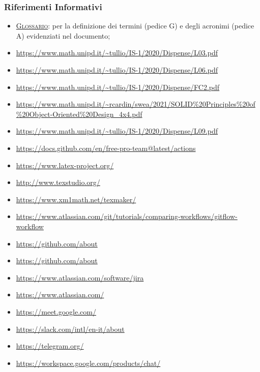     \subsubsection{Riferimenti Informativi}
        \begin{itemize}
        	\item \textsc{\href{https://github.com/Three-Way-Milkshake/docs/wiki/Glossario}{Glossario}}: per la definizione dei termini (pedice G) e degli acronimi (pedice A) evidenziati nel documento;
            \item \url{https://www.math.unipd.it/~tullio/IS-1/2020/Dispense/L03.pdf}
            \item \url{https://www.math.unipd.it/~tullio/IS-1/2020/Dispense/L06.pdf}
            \item \url{https://www.math.unipd.it/~tullio/IS-1/2020/Dispense/FC2.pdf}
            \item \url{https://www.math.unipd.it/~rcardin/swea/2021/SOLID\%20Principles\%20of\%20Object-Oriented\%20Design_4x4.pdf}
            \item \url{https://www.math.unipd.it/~tullio/IS-1/2020/Dispense/L09.pdf}
            \item \url{https://docs.github.com/en/free-pro-team@latest/actions}
            \item \url{https://www.latex-project.org/}
            \item \url{http://www.texstudio.org/}
            \item \url{https://www.xm1math.net/texmaker/}
            \item \url{https://www.atlassian.com/git/tutorials/comparing-workflows/gitflow-workflow}
            \item \url{https://github.com/about}
            \item \url{https://github.com/about}
            \item \url{https://www.atlassian.com/software/jira}
            \item \url{https://www.atlassian.com/}
            \item \url{https://meet.google.com/}
            \item \url{https://slack.com/intl/en-it/about}
            \item \url{https://telegram.org/}
            \item \url{https://workspace.google.com/products/chat/}
        \end{itemize}

\pagebreak
